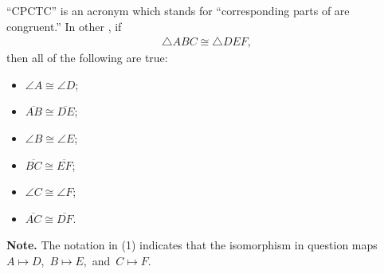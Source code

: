 \documentclass[12pt]{article}
\begin{document}
``CPCTC'' is an acronym which stands for ``corresponding parts of   are congruent.''  In other , if 
\begin{align}
\triangle ABC \cong \triangle DEF,
\end{align}
then all of the following are true:

\begin{itemize}
\item $\angle A \cong \angle D$;
\item $\overline{AB} \cong \overline{DE}$;
\item $\angle B \cong \angle E$;
\item $\overline{BC} \cong \overline{EF}$;
\item $\angle C \cong \angle F$;
\item $\overline{AC} \cong \overline{DF}$.
\end{itemize}

\textbf{Note.}\; The notation in (1) indicates that the isomorphism in question maps $A\mapsto D$,\, $B\mapsto E$,\, and\, $C\mapsto F$.
\end{document}

